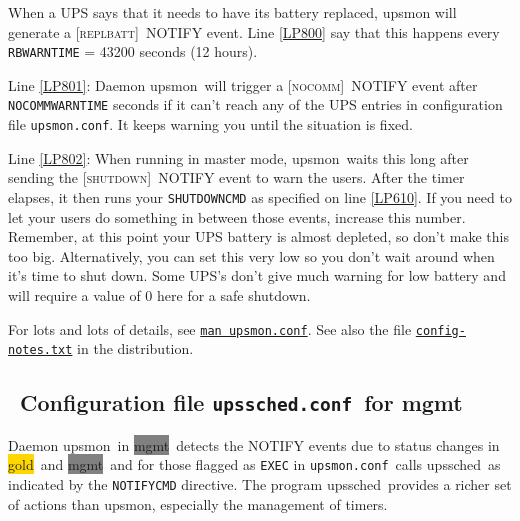 \documentclass[12pt]{article}
\newlength{\headersep}\setlength{\headersep}{3mm}
\newcommand{\Hsep}{\hspace{\headersep}}
\newcommand{\upsmon}{\mbox{\textcolor{MONCOLOUR}{upsmon}}}
\newcommand{\upssched}{\mbox{\textcolor{SCHEDCOLOUR}{upssched}}}
\newcommand{\gold}[1][gold]{\colorbox{GOLD}{#1}}
\newcommand{\mgmt}[1][mgmt]{\colorbox{GRAY}{#1}}
\newcommand{\SHUTDOWN}{\textcolor{MONCOLOUR}{\textsc{shutdown}}}
\newcommand{\REPLBATT}{\textcolor{MONCOLOUR}{\textsc{replbatt}}}
\newcommand{\NOCOMM}{\textcolor{MONCOLOUR}{\textsc{nocomm}}}
\newcommand{\NOTev}[1]{\textcolor{MONCOLOUR}{[{#1}]}}
\newcommand{\upsmonconf}{\textcolor{MONCOLOUR}{\texttt{upsmon.conf}}}
\newcommand{\upsschedconf}{\textcolor{SCHEDCOLOUR}{\texttt{upssched.conf}}}
\newcommand{\NUTman}[1]{\href{http://networkupstools.org/docs/man/#1.html}{\texttt{man #1}}}
\begin{document}
When a UPS says that it needs to have its battery replaced, upsmon will
generate a \NOTev{\REPLBATT}\ NOTIFY event.  Line \ref{LP800} say that this happens
every \texttt{RBWARNTIME} = 43200 seconds (12 hours).

Line \ref{LP801}: Daemon \upsmon\ will trigger a \NOTev{\NOCOMM}\ NOTIFY event after
\texttt{NOCOMMWARNTIME} seconds if it can't reach any of the UPS entries in
configuration file \upsmonconf.  It keeps warning you until the situation is
fixed.

Line \ref{LP802}: When running in master mode, \upsmon\ waits this long after
sending the \NOTev{\SHUTDOWN}\ NOTIFY event to warn the users. After the timer
elapses, it then runs your \texttt{SHUTDOWNCMD} as specified on line
\ref{LP610}.  If you need to let your users do something in between those
events, increase this number. Remember, at this point your UPS battery is
almost depleted, so don't make this too big.  Alternatively, you can set this
very low so you don't wait around when it's time to shut down. Some UPS's
don't give much warning for low battery and will require a value of 0 here for
a safe shutdown.

For lots and lots of details, see \NUTman{upsmon.conf}.  See also the file
\href{https://github.com/networkupstools/nut/blob/master/docs/config-notes.txt}
     {\texttt{config{\allowbreak}-notes.txt}} in the distribution.

\subsection{\Hsep\ Configuration file \upsschedconf\ for mgmt}\label{section:upsschedconf.big}

Daemon \upsmon\ in \mgmt\ detects the NOTIFY events due to status changes in
\gold\ and \mgmt\ and for those flagged as \texttt{EXEC} in \upsmonconf\ calls
\upssched\ as indicated by the \texttt{NOTIFYCMD} directive.  The program
\upssched\ provides a richer set of actions than \upsmon, especially the
management of timers.
\end{document}
